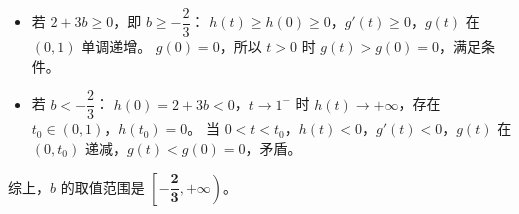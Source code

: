 \documentclass{article}
\begin{document}
\begin{enumerate}[label=(\arabic*)]
\begin{itemize}
    \item 若 $2+3b\ge 0$，即 $b\ge -\dfrac23$：
    $h(t)\ge h(0)\ge0$，$g'(t)\ge0$，$g(t)$ 在 $(0,1)$ 单调递增。
    $g(0)=0$，所以 $t>0$ 时 $g(t)>g(0)=0$，满足条件。
    \item 若 $b<-\dfrac23$：
    $h(0)=2+3b<0$，$t\to1^-$ 时 $h(t)\to+\infty$，存在 $t_0\in(0,1)$，$h(t_0)=0$。
    当 $0<t<t_0$，$h(t)<0$，$g'(t)<0$，$g(t)$ 在 $(0,t_0)$ 递减，$g(t)<g(0)=0$，矛盾。
\end{itemize}

综上，$b$ 的取值范围是 $\boldsymbol{\left[-\dfrac{2}{3},+\infty\right)}$。
\end{enumerate}
\end{document}
